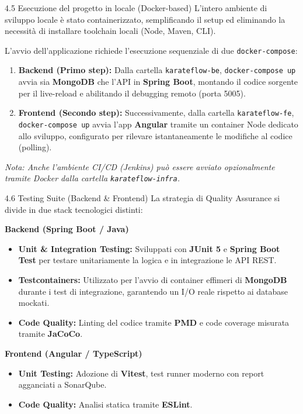 \documentclass[aspectratio=169, 10pt]{beamer}
\begin{document}
\begin{frame}{4.5 Esecuzione del progetto in locale (Docker-based)}
  L'intero ambiente di sviluppo locale è stato containerizzato, semplificando il setup ed eliminando la necessità di installare toolchain locali (Node, Maven, CLI).
  \vspace{0.2cm}

  L'avvio dell'applicazione richiede l'esecuzione sequenziale di due \texttt{docker-compose}:
  \begin{enumerate}
    \item \textbf{Backend (Primo step):} Dalla cartella \texttt{karateflow-be}, \texttt{docker-compose up} avvia sia \textbf{MongoDB} che l'API in \textbf{Spring Boot}, montando il codice sorgente per il live-reload e abilitando il debugging remoto (porta 5005).
    \item \textbf{Frontend (Secondo step):} Successivamente, dalla cartella \texttt{karateflow-fe}, \texttt{docker-compose up} avvia l'app \textbf{Angular} tramite un container Node dedicato allo sviluppo, configurato per rilevare istantaneamente le modifiche al codice (polling).
  \end{enumerate}
  \vspace{0.2cm}
  \textit{Nota: Anche l'ambiente CI/CD (Jenkins) può essere avviato opzionalmente tramite Docker dalla cartella \texttt{karateflow-infra}.}
\end{frame}

\begin{frame}{4.6 Testing Suite (Backend \& Frontend)}
  La strategia di Quality Assurance si divide in due stack tecnologici distinti:
  \vspace{0.2cm}
  
  \textbf{Backend (Spring Boot / Java)}
  \begin{itemize}
    \item \textbf{Unit \& Integration Testing:} Sviluppati con \textbf{JUnit 5} e \textbf{Spring Boot Test} per testare unitariamente la logica e in integrazione le API REST.
    \item \textbf{Testcontainers:} Utilizzato per l'avvio di container effimeri di \textbf{MongoDB} durante i test di integrazione, garantendo un I/O reale rispetto ai database mockati.
    \item \textbf{Code Quality:} Linting del codice tramite \textbf{PMD} e code coverage misurata tramite \textbf{JaCoCo}.
  \end{itemize}
  
  \vspace{0.2cm}
  \textbf{Frontend (Angular / TypeScript)}
  \begin{itemize}
    \item \textbf{Unit Testing:} Adozione di \textbf{Vitest}, test runner moderno con report agganciati a SonarQube.
    \item \textbf{Code Quality:} Analisi statica tramite \textbf{ESLint}.
  \end{itemize}
\end{frame}
\end{document}
